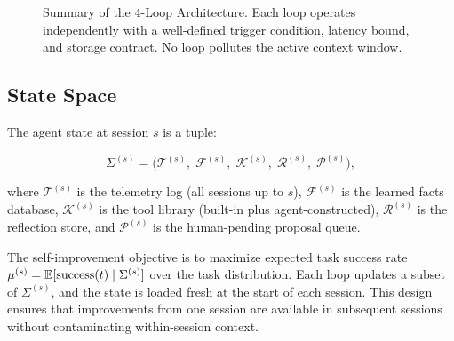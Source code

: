 \begin{figure}[H]
\centering
{}
\caption{Summary of the 4-Loop Architecture. Each loop operates independently
with a well-defined trigger condition, latency bound, and storage contract.
No loop pollutes the active context window.}
\label{fig:architecture}
\end{figure}

\subsection{State Space}

The agent state at session $s$ is a tuple:

\begin{equation}
\label{eq:state}
\Sigma^{(s)} = \bigl( \mathcal{T}^{(s)},\; \mathcal{F}^{(s)},\; \mathcal{K}^{(s)},\;
               \mathcal{R}^{(s)},\; \mathcal{P}^{(s)} \bigr),
\end{equation}

where $\mathcal{T}^{(s)}$ is the telemetry log (all sessions up to $s$),
$\mathcal{F}^{(s)}$ is the learned facts database, $\mathcal{K}^{(s)}$ is the
tool library (built-in plus agent-constructed), $\mathcal{R}^{(s)}$ is the
reflection store, and $\mathcal{P}^{(s)}$ is the human-pending proposal queue.

The self-improvement objective is to maximize expected task success rate
$\mu^{(s)} = \operatorname{\mathbb{E}}[\text{success}(t) \mid \Sigma^{(s)}]$ over the task distribution.
Each loop updates a subset of $\Sigma^{(s)}$, and the state is loaded fresh at
the start of each session. This design ensures that improvements from one session
are available in subsequent sessions without contaminating within-session context.

